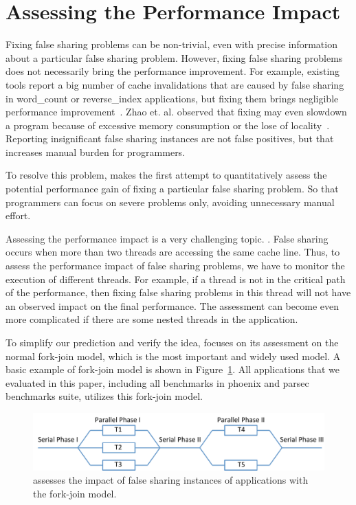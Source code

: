 \section{Assessing the Performance Impact}

\label{sec:predictimprove}

Fixing false sharing problems can be non-trivial, even with precise information about a particular false sharing problem. However, fixing false sharing problems does not necessarily bring the performance improvement. For example, existing tools report a big number of cache invalidations that are caused by false sharing in word\_count or reverse\_index applications, but fixing them brings negligible performance improvement~\cite{Sheriff, Predator}. Zhao et. al. observed that fixing may even slowdown a program because of excessive memory consumption or the lose of locality~\cite{qinzhao}. Reporting insignificant false sharing instances are not false positives, but that increases manual burden for programmers.

To resolve this problem, \cheetah{} makes the first attempt to quantitatively assess the potential performance gain of fixing a particular false sharing problem. So that programmers can focus on severe problems only, avoiding unnecessary manual effort.

Assessing the performance impact is a very challenging topic. . False sharing occurs when more than two threads are accessing the same cache line. Thus, to assess the performance impact of false sharing problems, we have to monitor the execution of different threads. For example, if a thread is not in the critical path of the performance, then fixing false sharing problems in this thread will not have an observed impact on the final performance. The assessment can become even more complicated if there are some nested threads in the application.

To simplify our prediction and verify the idea, \cheetah{} focuses on its assessment on the normal fork-join model, which is the most important and widely used model. A basic example of fork-join model is shown in  Figure~\ref{fig:forkjoinmodel}. All applications that we evaluated in this paper, including all benchmarks in phoenix and parsec benchmarks suite, utilizes this fork-join model. 

\begin{figure}[ht!]
\begin{center}
\includegraphics[width=6.5in]{figure/forkjoin}
\end{center}
\caption{\Cheetah{} assesses the impact of false sharing instances of applications with the fork-join model.
\label{fig:forkjoinmodel}}
\end{figure}

